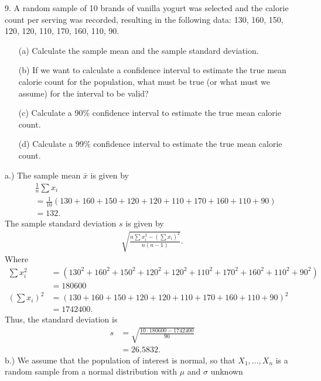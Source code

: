 \documentclass{report}
\begin{document}
\pagebreak \bigbreak \noindent 
\begin{mdframed}
9. A random sample of 10 brands of vanilla yogurt was selected and the calorie count per serving was recorded, resulting in the following data: 130, 160, 150, 120, 120, 110, 170, 160, 110, 90.
\begin{itemize}
    \item[(a)] Calculate the sample mean and the sample standard deviation.
    \item[(b)] If we want to calculate a confidence interval to estimate the true mean calorie count for the population, what must be true (or what must we assume) for the interval to be valid?
    \item[(c)] Calculate a 90\% confidence interval to estimate the true mean calorie count.
    \item[(d)] Calculate a 99\% confidence interval to estimate the true mean calorie count.
\end{itemize}
\end{mdframed}
\bigbreak \noindent 
a.) The sample mean $\bar{x}$ is given by
\begin{align*}
    &\frac{1}{n}\sum x_{i} \\
    &= \frac{1}{10}(130 + 160 + 150+ 120 + 120  + 110 + 170 + 160 + 110 + 90) \\
    &=132
.\end{align*}
The sample standard deviation $s$ is given by
\begin{align*}
    \sqrt{\frac{n\sum x_{i}^{2} - \left(\sum x_{i}\right)^{2}}{n(n-1)}} 
.\end{align*}
Where
\begin{align*}
    \sum x_{i}^{2} &= (130^{2} + 160^{2} + 150^{2} + 120^{2} + 120^{2} + 110^{2} + 170^{2} + 160^{2} + 110^{2} + 90^{2}) \\
                   &=180600 \\
    \left(\sum x_{i}\right)^{2} &= (130 + 160 + 150 + 120 + 120 + 110 + 170 + 160 + 110 + 90)^{2} \\
                     &=1742400
.\end{align*}
Thus, the standard deviation is 
\begin{align*}
    s &= \sqrt{\frac{10\cdot 180600 - 1742400}{90}} \\
    &=26.5832
.\end{align*}
\bigbreak \noindent 
b.) We assume that the population of interest is normal, so that $X_{1}, ...,X_{n}$ is a random sample from a normal distribution with $\mu$ and $\sigma$ unknown
\end{document}
